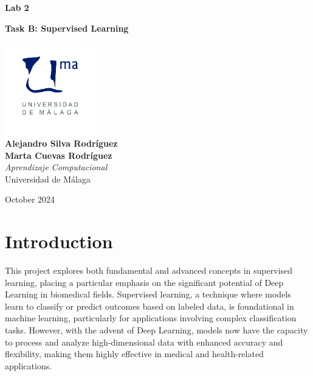 \documentclass{article}
\begin{document}
\begin{titlepage}
	\centering
	\vspace*{3cm}
	
	{\Huge \textbf{Lab 2}\\[0.5cm]}

	{\Huge \textbf{Task B: Supervised Learning}\\[0.5cm]}
	
	\vspace{2cm}
	\includegraphics[width=0.3\textwidth]{images/uma_logo.jpg}\\[1cm]
	
	{\LARGE \textbf{Alejandro Silva Rodríguez}\\[0.5cm]}
	{\LARGE \textbf{Marta Cuevas Rodríguez}\\[0.5cm]}
	{\large \textit{Aprendizaje Computacional}\\
		Universidad de Málaga\\
		}
	
	\vfill
	
	{\large October 2024}
\end{titlepage}

\tableofcontents

\newpage

\section{Introduction}

This project explores both fundamental and advanced concepts in supervised learning, placing a particular emphasis on the significant potential of Deep Learning in biomedical fields. Supervised learning, a technique where models learn to classify or predict outcomes based on labeled data, is foundational in machine learning, particularly for applications involving complex classification tasks. However, with the advent of Deep Learning, models now have the capacity to process and analyze high-dimensional data with enhanced accuracy and flexibility, making them highly effective in medical and health-related applications.
\end{document}
